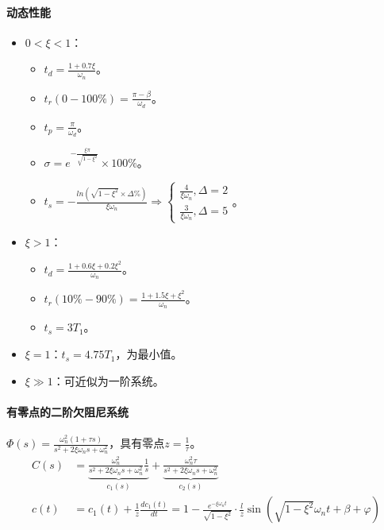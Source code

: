 \documentclass[
12pt, %
a4paper, 
oneside, %
headinclude,footinclude, %
]{scrartcl}
\begin{document}
\paragraph{动态性能}
\begin{itemize}
\item $ 0 < \xi < 1 $：
\begin{itemize}
\item $ t_d = \frac{1 + 0.7\xi}{\omega_n} $。
\item $ t_r(0 - 100\%) = \frac{\pi - \beta}{\omega_d} $。
\item $ t_p = \frac{\pi}{\omega_d} $。
\item $ \sigma = e^{-\frac{\xi \pi}{\sqrt{1 - \xi^2}}} \times 100\% $。
\item $ t_s = -\frac{ln(\sqrt{1 - \xi^2} \times \Delta\%)}{\xi \omega_n} \Rightarrow \begin{cases} \frac{4}{\xi \omega_n}, \Delta = 2 \\  \frac{3}{\xi \omega_n}, \Delta = 5 \end{cases} $。
\end{itemize}
\item $ \xi > 1 $：
\begin{itemize}
\item $ t_d = \frac{1 + 0.6\xi + 0.2\xi^2}{\omega_n} $。
\item $ t_r(10\% - 90\%) = \frac{1 + 1.5\xi + \xi^2}{\omega_n} $。
\item $ t_s = 3T_1 $。
\end{itemize}
\item $ \xi = 1 $：$ t_s = 4.75 T_1 $，为最小值。
\item $ \xi \gg 1 $：可近似为一阶系统。
\end{itemize}
\paragraph{有零点的二阶欠阻尼系统}
$ \Phi(s) = \frac{\omega_n^2(1 + \tau s)}{s^2 + 2\xi \omega_n s + \omega_n^2} $，具有零点$ z = \frac{1}{\tau} $。
\begin{align*}
C(s) &= \underbrace{\frac{\omega_n^2}{s^2 + 2\xi \omega_n s + \omega_n^2} \frac{1}{s}}_{c_1(s)} + \underbrace{\frac{\omega_n^2 \tau}{s^2 + 2\xi \omega_n s + \omega_n^2}}_{c_2(s)} \\
c(t) &= c_1(t) + \frac{1}{z} \frac{d c_1(t)}{dt} = 1 - \frac{e^{-\xi \omega_n t}}{\sqrt{1 - \xi^2}} \cdot \frac{l}{z} \sin(\sqrt{1 - \xi^2}\omega_n t + \beta + \varphi)
\end{align*}
\end{document}
